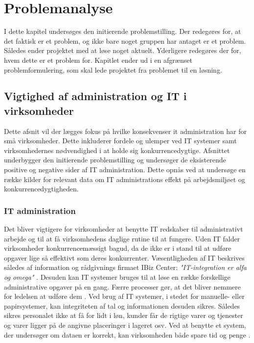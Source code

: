 \chapter{Problemanalyse}\label{ch:analyse}
I dette kapitel undersøges den initierende problemstilling. Der redegøres for, at det faktisk er et problem, og ikke bare noget gruppen har antaget er et problem. Således ender projektet med at løse noget aktuelt. Yderligere redegøres der for, hvem dette er et problem for. Kapitlet ender ud i en afgrænset problemformulering, som skal lede projektet fra problemet til en løsning.

\section{Vigtighed af administration og IT i virksomheder}
%
%
Dette afsnit vil der lægges fokus på hvilke konsekvenser it administration har for små virksomheder. Dette inkluderer fordele og ulemper ved IT systemer samt virksomhedernes nødvendighed i at holde sig konkurrencedygtige. Afsnittet underbygger den initierende problemstilling og undersøger de eksisterende positive og negative sider af IT administration. Dette opnås ved at undersøge en række kilder for relevant data om IT administrations effekt på arbejdsmiljøet og konkurrencedygtigheden.

\subsection{IT administration}
Det bliver vigtigere for virksomheder at benytte IT redskaber til administrativt arbejde og til at få virksomhedens daglige rutine til at fungere. Uden IT falder virksomheder konkurrencemæssigt bagud, da de ikke er i stand til at udføre opgaver lige så effektivt som deres konkurrenter. Væsentligheden af IT beskrives således af information og rådgivnings firmaet IBiz Center: \textit{"IT-integration er alfa og omega"} \citep{case_green_team}. Desuden kan IT systemer bruges til at løse en række forskellige administrative opgaver på en gang. Færre processer gør, at det bliver nemmere for ledelsen at udføre dem \citep{Ibiz_streamline}. Ved brug af IT systemer, i stedet for manuelle- eller papirsystemer, kan integriteten af tal og informationen desuden sikres. Således sikres personalet ikke at få for lidt i løn, kunder får de rigtige varer og tjenester og varer ligger på de angivne placeringer i lageret osv. \citep{Ibiz_streamline} Ved at benytte et system, der undersøger om dataen er korrekt, kan virksomheden både spare tid og penge \citep{case_green_team}. 

